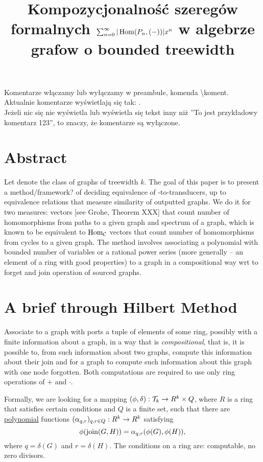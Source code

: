 
\title{Kompozycjonalność szeregów formalnych $\sum_{n=0}^{\infty}  | \operatorname{Hom}(P_n, (-)) | x^n$ w algebrze grafow o bounded treewidth}

	\maketitle
\noindent Komentarze włączamy lub wyłączamy w preambule, komenda \textbackslash koment.\\
Aktualnie komentarze wyświetlają się tak: .\\
Jeżeli nic się nie wyświetla lub wyświetla się tekst inny niż ''To jest przykładowy komentarz 123'', to znaczy, że komentarze są wyłączone.\\
\section{Abstract}
Let \twk denote the class of graphs of treewidth $k$.
The goal of this paper is to present a method/framework? of deciding equivalence of \twk-to-\twk transducers, up to equivalence relations that measure similarity of outputted graphs. We do it for two measures: \HomP vectors [see Grohe, Theorem XXX] that count number of homomorphisms from paths to a given graph and spectrum of a graph, which is known to be equivalent to $\operatorname{Hom}_{\mathcal{C}}$ vectors that count number of homomorphisms from cycles to a given graph. The method involves associating a polynomial with bounded number of variables or a rational power series (more generally -- an element of a ring with good properties) to a graph in a compositional way wrt to forget and join operation of sourced graphs. 

\section{A brief through Hilbert Method}
Associate to a graph with ports a tuple of elements of some ring, possibly with a finite information about a graph, in a way that is \emph{compositional}, that is, it is possible to, from such information about two graphs, compute this information about their join and for a graph to compute such information about this graph with one node forgotten. Both computations are required to use only ring operations of $+$ and $\cdot$.

Formally, we are looking for a mapping $(\phi, \delta):\mathcal{T}_{k}\rightarrow R^k \times Q$, where $R$ is a ring that satisfies certain conditions and $Q$ is a finite set, such that there are \underline{polynomial} functions $(\alpha_{q,r})_{q, r \in Q}:R^k\rightarrow R^k$ satisfying
$$
	\phi(\mathrm{join}(G, H)) = \alpha_{q, r}(\phi(G), \phi(H)),
$$
where $q = \delta(G)$ and $r = \delta(H)$. The conditions on a ring are: computable, no zero divisors.
